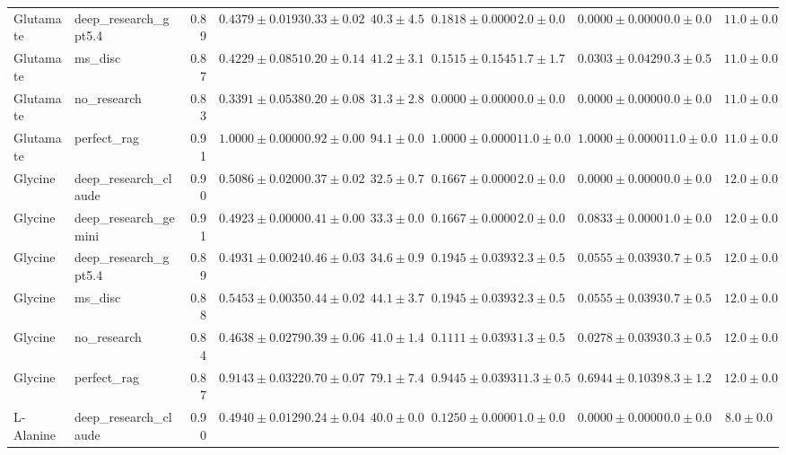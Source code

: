 \begin{table}[htbp]
\begin{tabular}{llrrrrrrrrr}
Glutamate & deep_research_gpt5.4 & 0.89 & $0.4379 \pm 0.0193$ & $0.33 \pm 0.02$ & $40.3 \pm 4.5$ & $0.1818 \pm 0.0000$ & $2.0 \pm 0.0$ & $0.0000 \pm 0.0000$ & $0.0 \pm 0.0$ & $11.0 \pm 0.0$ \\
Glutamate & ms_disc & 0.87 & $0.4229 \pm 0.0851$ & $0.20 \pm 0.14$ & $41.2 \pm 3.1$ & $0.1515 \pm 0.1545$ & $1.7 \pm 1.7$ & $0.0303 \pm 0.0429$ & $0.3 \pm 0.5$ & $11.0 \pm 0.0$ \\
Glutamate & no_research & 0.83 & \cellcolor{red!25}$0.3391 \pm 0.0538$ & $0.20 \pm 0.08$ & $31.3 \pm 2.8$ & $0.0000 \pm 0.0000$ & $0.0 \pm 0.0$ & $0.0000 \pm 0.0000$ & $0.0 \pm 0.0$ & $11.0 \pm 0.0$ \\
Glutamate & perfect_rag & 0.91 & \cellcolor{green!25}$1.0000 \pm 0.0000$ & $0.92 \pm 0.00$ & $94.1 \pm 0.0$ & $1.0000 \pm 0.0000$ & $11.0 \pm 0.0$ & $1.0000 \pm 0.0000$ & $11.0 \pm 0.0$ & $11.0 \pm 0.0$ \\
\midrule
Glycine & deep_research_claude & 0.90 & $0.5086 \pm 0.0200$ & $0.37 \pm 0.02$ & $32.5 \pm 0.7$ & $0.1667 \pm 0.0000$ & $2.0 \pm 0.0$ & $0.0000 \pm 0.0000$ & $0.0 \pm 0.0$ & $12.0 \pm 0.0$ \\
Glycine & deep_research_gemini & 0.91 & $0.4923 \pm 0.0000$ & $0.41 \pm 0.00$ & $33.3 \pm 0.0$ & $0.1667 \pm 0.0000$ & $2.0 \pm 0.0$ & $0.0833 \pm 0.0000$ & $1.0 \pm 0.0$ & $12.0 \pm 0.0$ \\
Glycine & deep_research_gpt5.4 & 0.89 & $0.4931 \pm 0.0024$ & $0.46 \pm 0.03$ & $34.6 \pm 0.9$ & $0.1945 \pm 0.0393$ & $2.3 \pm 0.5$ & $0.0555 \pm 0.0393$ & $0.7 \pm 0.5$ & $12.0 \pm 0.0$ \\
Glycine & ms_disc & 0.88 & $0.5453 \pm 0.0035$ & $0.44 \pm 0.02$ & $44.1 \pm 3.7$ & $0.1945 \pm 0.0393$ & $2.3 \pm 0.5$ & $0.0555 \pm 0.0393$ & $0.7 \pm 0.5$ & $12.0 \pm 0.0$ \\
Glycine & no_research & 0.84 & \cellcolor{red!25}$0.4638 \pm 0.0279$ & $0.39 \pm 0.06$ & $41.0 \pm 1.4$ & $0.1111 \pm 0.0393$ & $1.3 \pm 0.5$ & $0.0278 \pm 0.0393$ & $0.3 \pm 0.5$ & $12.0 \pm 0.0$ \\
Glycine & perfect_rag & 0.87 & \cellcolor{green!25}$0.9143 \pm 0.0322$ & $0.70 \pm 0.07$ & $79.1 \pm 7.4$ & $0.9445 \pm 0.0393$ & $11.3 \pm 0.5$ & $0.6944 \pm 0.1039$ & $8.3 \pm 1.2$ & $12.0 \pm 0.0$ \\
\midrule
L-Alanine & deep_research_claude & 0.90 & \cellcolor{red!25}$0.4940 \pm 0.0129$ & $0.24 \pm 0.04$ & $40.0 \pm 0.0$ & $0.1250 \pm 0.0000$ & $1.0 \pm 0.0$ & $0.0000 \pm 0.0000$ & $0.0 \pm 0.0$ & $8.0 \pm 0.0$ \\

\end{tabular}
\end{table}
